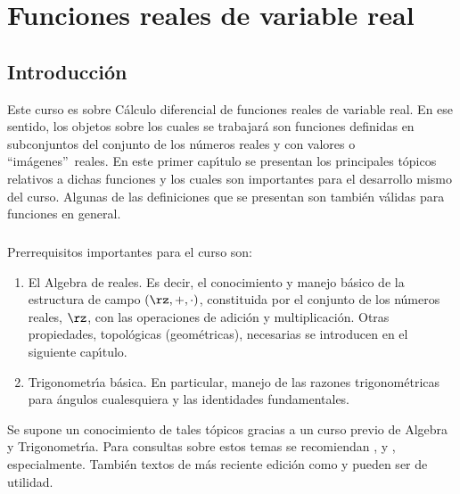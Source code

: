 

\pagecolor{fondpaille}  
\chapter{Funciones reales de variable real}

\section{Introducci\'{o}n}

Este curso es sobre C\'{a}lculo diferencial de funciones reales de variable
real. En ese sentido, los objetos sobre los cuales se trabajar\'{a} son
funciones definidas en subconjuntos del conjunto de los n\'{u}meros reales y
con valores o \textquotedblleft im\'{a}genes\textquotedblright\ reales. En
este primer cap\'{\i}tulo se presentan los principales t\'{o}picos relativos a
dichas funciones y los cuales son importantes para el desarrollo mismo del
curso. Algunas de las definiciones que se presentan son tambi\'{e}n
v\'{a}lidas para funciones en general.

\paragraph{}

Prerrequisitos importantes para el curso son:

\begin{enumerate}
\item El Algebra de reales. Es decir, el conocimiento y manejo b\'{a}sico de
la estructura de campo $(\rz,+,\cdot)$, constituida por el conjunto de los
n\'{u}meros reales, $\rz$, con las operaciones de adici\'{o}n y
multiplicaci\'{o}n. Otras propiedades, topol\'{o}gicas (geom\'{e}tricas),
necesarias se introducen en el siguiente cap\'{\i}tulo.

\item Trigonometr\'{\i}a b\'{a}sica. En particular, manejo de las razones
trigonom\'{e}tricas para \'{a}ngulos cualesquiera y las identidades fundamentales.
\end{enumerate}

Se supone un conocimiento de tales t\'{o}picos gracias a un curso previo de
Algebra y Trigonometr\'{\i}a. Para consultas sobre estos temas se recomiendan
\cite{Taylor}, \cite{Vance} y \cite{leh}, especialmente. Tambi\'{e}n textos de
m\'{a}s reciente edici\'{o}n como \cite{Lei} y \cite{Swo} pueden ser de utilidad.

\paragraph{}

